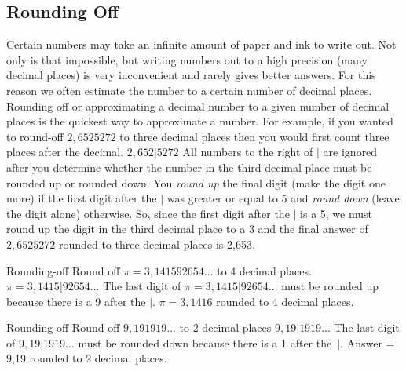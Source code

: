             \subsection*{Rounding Off}
            \nopagebreak
        \label{m30853*id63743}Certain numbers may take an infinite amount of paper and ink to write out. Not only is that impossible, but writing numbers out to a high precision (many decimal places) is very inconvenient and rarely gives better answers. For this reason we often estimate the number to a certain number of decimal places.
Rounding off or approximating a decimal number to a given number of decimal places is the quickest way to approximate a number. For example, if you wanted to round-off $2,6525272$ to three decimal places then you would first count three places after the decimal.
$2,652|5272$
All numbers to the right of $|$ are ignored after you determine whether the number in the third decimal place must be rounded up or rounded down. You \textsl{round up} the final digit (make the digit one more) if the first digit after the $|$ was greater or equal to 5 and \textsl{round down} (leave the digit alone) otherwise.
So, since the first digit after the $|$ is a 5, we must round up the digit in the third decimal place to a 3 and the final answer of $2,6525272$ rounded to three decimal places is 2,653.\par 
\label{m30853*secfhsst!!!underscore!!!id320}
      \noindent
\begin{wex}{Rounding-off }{
        \label{m30853*probfhsst!!!underscore!!!id321}
        \label{m30853*id63850}Round off $\pi =3,141592654...$ to 4 decimal places. 
        }
{
          $\pi =3,1415|92654...$
        The last digit of $\pi =3,1415|92654...$ must be rounded up because there is a 9 after the $|$.
        $\pi =3,1416$ rounded to 4 decimal places. 
    }
\end{wex}
    \noindent
\label{m30853*secfhsst!!!underscore!!!id346}
      \noindent
\begin{wex}{Rounding-off }{
Round off $9,191919...$ to 2 decimal places 
       }
{ 
          $9,19|1919...$
The last digit of $9,19|1919...$ must be rounded down because there is a 1 after the~$|$.
Answer = 9,19 rounded to 2 decimal places. 
    }
\end{wex}
    \noindent
      \label{m30853*uid17}
